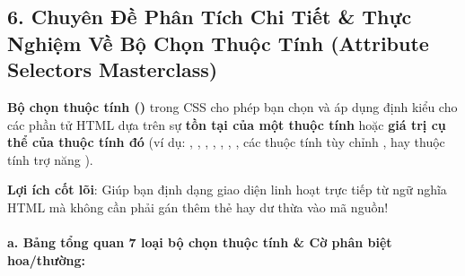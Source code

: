 \subsection{6. Chuyên Đề Phân Tích Chi Tiết \& Thực Nghiệm Về Bộ Chọn Thuộc Tính (Attribute Selectors Masterclass)}

\begin{conceptBox}
\textbf{Bộ chọn thuộc tính ()} trong CSS cho phép bạn chọn và áp dụng định kiểu cho các phần tử HTML dựa trên sự \textbf{tồn tại của một thuộc tính} hoặc \textbf{giá trị cụ thể của thuộc tính đó} (ví dụ: , , , , , , , các thuộc tính tùy chỉnh , hay thuộc tính trợ năng ).
\par\vspace{3pt}
\textbf{Lợi ích cốt lõi}: Giúp bạn định dạng giao diện linh hoạt trực tiếp từ ngữ nghĩa HTML mà không cần phải gán thêm thẻ  hay  dư thừa vào mã nguồn!
\end{conceptBox}

\paragraph{a. Bảng tổng quan 7 loại bộ chọn thuộc tính \& Cờ phân biệt hoa/thường:}

